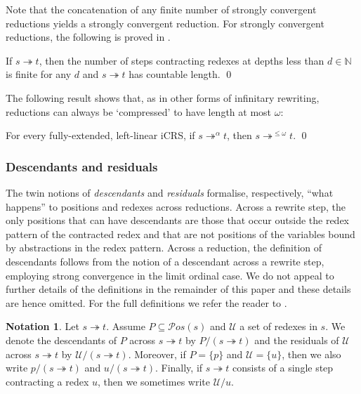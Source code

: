 \documentclass{LMCS}
\theoremstyle{plain}
\theoremstyle{definition}
\newtheorem{notation}[thm]{Notation}
\newcommand{\trewt}{\twoheadrightarrow}
\newcommand{\trewtp}[1]{\twoheadrightarrow^{#1}}
\newcommand{\pos}[1]{\mathcal{P}os(#1)}
\newcommand{\natnum}{\mathbb{N}}
\begin{document}
Note that the concatenation of any finite number of strongly convergent reductions yields a strongly convergent reduction. For strongly convergent reductions, the following is proved in \cite{JJ05a}.
\begin{lem}
\label{depthlem}
If $s \trewt t$, then the number of steps contracting redexes at depths less than $d \in \natnum$ is finite for any $d$ and $s \trewt t$ has countable length. \qed
\end{lem}

The following result \cite{JJ05a} shows that, as in other forms of infinitary rewriting, reductions can always be `compressed' to have length at most $\omega$:

\begin{thm}[Compression]
\label{the:compression}
For every fully-extended, left-linear iCRS, if $s \trewtp{\alpha} t$, then $s \trewtp{\leq \omega} t$. \qed
\end{thm}

\subsubsection{Descendants and residuals}

The twin notions of \emph{descendants} and \emph{residuals} formalise, respectively, ``what happens'' to positions and redexes across reductions. Across a rewrite step, the only positions that can have descendants are those that occur outside the redex pattern of the contracted redex and that are not positions of the variables bound by abstractions in the redex pattern. Across a reduction, the definition of descendants follows from the notion of a descendant across a rewrite step, employing strong convergence in the limit ordinal case. We do not appeal to further details of the definitions in the remainder of this paper and these details are hence omitted. For the full definitions we refer the reader to \cite{JJ05a}.

\begin{notation}
Let $s \trewt t$. Assume $P \subseteq \pos{s}$ and $\mathcal{U}$ a set of redexes in $s$. We denote the descendants of $P$ across $s \trewt t$ by $P/(s \trewt t)$ and the residuals of $\mathcal{U}$ across $s \trewt t$ by $\mathcal{U}/(s \trewt t)$. Moreover, if $P = \{ p \}$ and $\mathcal{U} = \{ u \}$, then we also write $p/(s \trewt t)$ and $u/(s \trewt t)$. Finally, if $s \trewt t$ consists of a single step contracting a redex $u$, then we sometimes write $\mathcal{U}/u$.
\end{notation}
\end{document}
